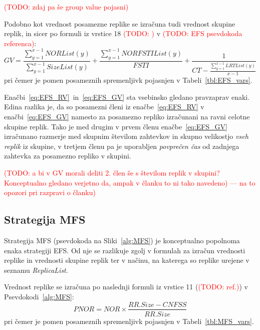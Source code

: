 \documentclass[a4paper, 12pt]{book}
\newcommand{\TODO}[1]{\textcolor{red}{(TODO: #1)}}
\begin{document}
\TODO{zdaj pa še group value pojasni}

\begin{samepage}
Podobno kot vrednost posamezne replike se izračuna tudi vrednost skupine
replik, in sicer po formuli iz vrstice 18 \TODO{} v
\TODO{EFS psevdokoda referenca}:
\begin{equation}
  \mathit{GV} = \frac{\sum\limits_{y=1}^{x-1} \mathit{NORList(y)}}{
                      \sum\limits_{y=1}^{x-1} \mathit{SizeList(y)}} +
                \frac{\sum\limits_{y=1}^{x-1} \mathit{NORFSTIList(y)}}{
                      \mathit{FSTI}} +
                \frac{1}{\mathit{CT} - \frac{\sum\limits_{y=1}^{x-1}
                         \mathit{LRTList(y)}}{x-1}}
  \label{eq:EFS_GV}
\end{equation}
pri čemer je pomen posameznih spremenljivk pojasnjen v
Tabeli~\ref{tbl:EFS_vars}.
\end{samepage}

Enačbi~\eqref{eq:EFS_RV}~in~\eqref{eq:EFS_GV} sta vsebinsko gledano
pravzaprav enaki. Edina razlika je, da so posamezni členi iz
enačbe~\eqref{eq:EFS_RV} v enačbi~\eqref{eq:EFS_GV} namesto za posamezno
repliko izračunani na ravni celotne skupine replik.
Tako je med drugim v prvem členu enačbe~\eqref{eq:EFS_GV} izračunano razmerje
med skupnim številom zahtevkov in skupno velikostjo \textit{vseh replik} iz
skupine, v tretjem členu pa je uporabljen \textit{povprečen čas} od zadnjega
zahtevka za posamezno repliko v skupini.

\TODO{a bi v GV morali deliti 2. člen še s številom replik v skupini?
Konceptualno gledano verjetno da, ampak v članku to ni tako navedeno) ---
na to opozori pri razpravi o članku}


\subsection{Strategija MFS}

Strategija MFS (psevdokoda na Sliki~\ref{alg:MFS})
je konceptualno popolnoma enaka strategiji EFS. Od nje se razlikuje
zgolj v formulah za izračun vrednosti replike in vrednosti skupine replik
ter v načinu, na katerega so replike urejene v seznamu \textit{ReplicaList}.

\begin{samepage}
Vrednost replike se izračuna po naslednji formuli iz vrstice 11
(\TODO{ref.}) v Psevdokodi~\ref{alg:MFS}:
\begin{equation}
  \mathit{PNOR} = \mathit{NOR} \times
                  \frac{\mathit{RR.Size} - \mathit{CNFSS}}{
                        \mathit{ RR.Size}}
  \label{eq:MFS_RV}
\end{equation}
pri čemer je pomen posameznih spremenljivk pojasnjen v
Tabeli~\ref{tbl:MFS_vars}.
\end{samepage}
\end{document}
